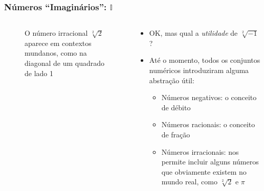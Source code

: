 \documentclass[usenames,dvipsnames,svgnames]{beamer}
\begin{document}
\begin{frame}	
	\frametitle{Números ``Imaginários'': $\mathbb{I}$}

	\begin{columns}[t]
	\begin{column}{.3\textwidth}
		\begin{figure}
			\newcommand{\pythagwidth}{2cm}
			\newcommand{\pythagheight}{2cm}
			\caption{\small O número irracional $\sqrt[2]{2}$ aparece em contextos mundanos, como na diagonal de um quadrado de lado 1}
		\end{figure}
	\end{column}
	\begin{column}{.7\textwidth}
		\begin{itemize}
		\item OK, mas qual a \emph{utilidade} de $\sqrt[2]{-1}$?
		\item Até o momento, todos os conjuntos numéricos introduziram alguma abstração útil:
		\begin{itemize}
			\item Números negativos: o conceito de débito
			\item Números racionais: o conceito de fração
			\item Números irracionais: nos permite incluir alguns números que obviamente existem no mundo real, como $\sqrt[2]{2}$ e $\pi$
		\end{itemize}
		\end{itemize}
	\end{column}
	\end{columns}

\end{frame}
\end{document}
